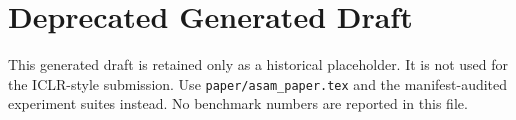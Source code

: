 \documentclass{article}
\begin{document}
\section*{Deprecated Generated Draft}

This generated draft is retained only as a historical placeholder. It is not used for
the ICLR-style submission. Use \texttt{paper/asam\_paper.tex} and the
manifest-audited experiment suites instead. No benchmark numbers are reported in
this file.
\end{document}
